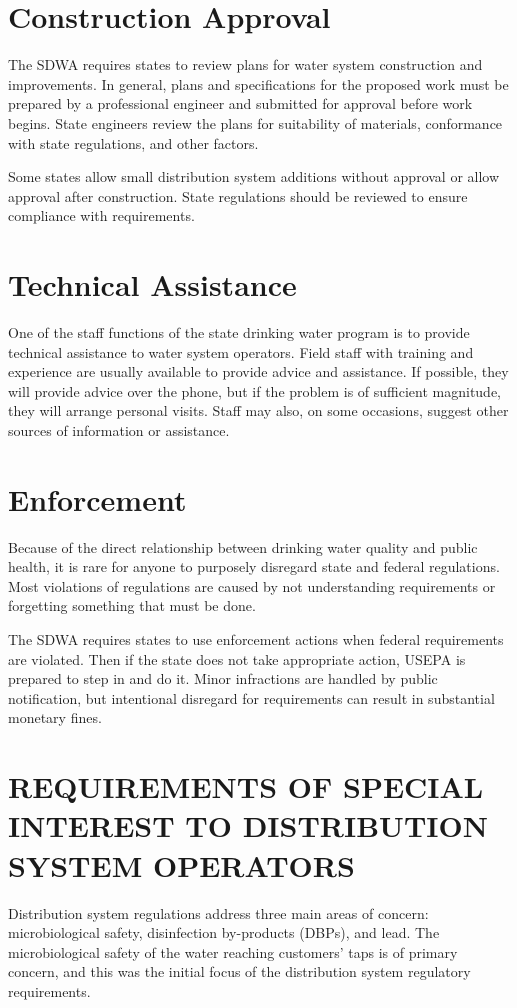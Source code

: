 \documentclass[10pt]{article}
\begin{document}
\section{Construction Approval}
The SDWA requires states to review plans for water system construction and improvements. In general, plans and specifications for the proposed work must be prepared by a professional engineer and submitted for approval before work begins. State engineers review the plans for suitability of materials, conformance with state regulations, and other factors.

Some states allow small distribution system additions without approval or allow approval after construction. State regulations should be reviewed to ensure compliance with requirements.

\section{Technical Assistance}
One of the staff functions of the state drinking water program is to provide technical assistance to water system operators. Field staff with training and experience are usually available to provide advice and assistance. If possible, they will provide advice over the phone, but if the problem is of sufficient magnitude, they will arrange personal visits. Staff may also, on some occasions, suggest other sources of information or assistance.

\section{Enforcement}
Because of the direct relationship between drinking water quality and public health, it is rare for anyone to purposely disregard state and federal regulations. Most violations of regulations are caused by not understanding requirements or forgetting something that must be done.

The SDWA requires states to use enforcement actions when federal requirements are violated. Then if the state does not take appropriate action, USEPA is prepared to step in and do it. Minor infractions are handled by public notification, but intentional disregard for requirements can result in substantial monetary fines.

\section{REQUIREMENTS OF SPECIAL INTEREST TO DISTRIBUTION SYSTEM OPERATORS}
Distribution system regulations address three main areas of concern: microbiological safety, disinfection by-products (DBPs), and lead. The microbiological safety of the water reaching customers' taps is of primary concern, and this was the initial focus of the distribution system regulatory requirements.
\end{document}
